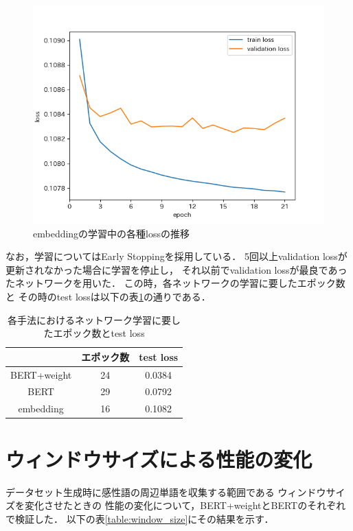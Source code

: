 	\begin{figure}[H]
		\centering
		\includegraphics[keepaspectratio, scale=0.8]{./figure/embeddings.png}
		\caption{embeddingの学習中の各種lossの推移}
		\label{fig:embedding_loss}
	\end{figure}

	なお，学習についてはEarly Stoppingを採用している．
	5回以上validation lossが更新されなかった場合に学習を停止し，
	それ以前でvalidation lossが最良であったネットワークを用いた．
	この時，各ネットワークの学習に要したエポック数と
	その時のtest lossは以下の表\ref{table:epoch_num}の通りである．

	\begin{table}[H]
		\centering
		\caption{各手法におけるネットワーク学習に要したエポック数とtest loss}
		\label{table:epoch_num}
		\begin{tabular}{|c|c|c|}
			\hline
			& エポック数 & test loss \\
			\hline
			BERT+weight & 24 & 0.0384 \\
			\hline
			BERT & 29 & 0.0792 \\
			\hline
			embedding & 16 & 0.1082 \\
			\hline
		\end{tabular}
	\end{table}

\section{ウィンドウサイズによる性能の変化}
	データセット生成時に感性語の周辺単語を収集する範囲である
	ウィンドウサイズを変化させたときの
	性能の変化について，BERT+weightとBERTのそれぞれで検証した．
	以下の表\ref{table:window_size}にその結果を示す．

